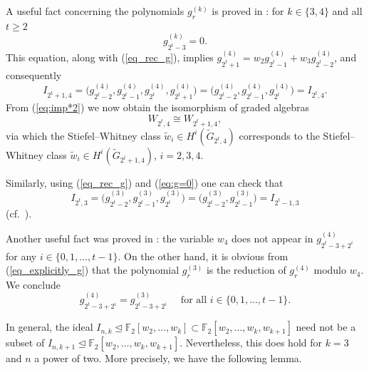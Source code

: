 \documentclass{amsart}
\theoremstyle{definition}
\theoremstyle{remark}
\numberwithin{equation}{section}
\newcommand{\gr}{\widetilde G}
\newcommand{\w}{\widetilde w}
\renewcommand{\ge}{\geqslant}
\begin{document}
A useful fact concerning the polynomials $g_r^{(k)}$ is proved in \cite[Lemma 2.3(ii)]{Korbas}: for $k\in\{3,4\}$ and all $t\ge2$
\begin{equation}\label{eq:g=0}
g_{2^t-3}^{(k)} = 0.
\end{equation}
This equation, along with (\ref{eq_rec_g}), implies 
$g_{2^t+1}^{(4)}=w_2 g_{2^t-1}^{(4)} + w_3 g_{2^t-2}^{(4)}$,
and consequently
\begin{equation}\label{I_2^t=I_2^t+1}
 I_{2^t+1,4}=\big(g_{2^t-2}^{(4)},g_{2^t-1}^{(4)},g_{2^t}^{(4)},g_{2^t+1}^{(4)}\big)=\big(g_{2^t-2}^{(4)},g_{2^t-1}^{(4)},g_{2^t}^{(4)}\big)=I_{2^t,4}.   
\end{equation}
From (\ref{eq:imp*2}) we now obtain the isomorphism of graded algebras
\begin{equation}\label{W_2^t=W_2^t+1}
 W_{2^t,4}\cong W_{2^t+1,4},   
\end{equation}
via which the Stiefel--Whitney class $\w_i\in H^i(\gr_{2^t,4})$ corresponds to the Stiefel--Whitney class $\w_i\in H^i(\gr_{2^t+1,4})$, $i=2,3,4$.

Similarly, using (\ref{eq_rec_g}) and (\ref{eq:g=0}) one can check that
\begin{equation}\label{I_2^t=I_2^t-1}
 I_{2^t,3}=\big(g_{2^t-2}^{(3)},g_{2^t-1}^{(3)},g_{2^t}^{(3)}\big)=\big(g_{2^t-2}^{(3)},g_{2^t-1}^{(3)}\big)=I_{2^t-1,3}  
\end{equation}
(cf.\ \cite[Remark 3.16]{CP-cl}).

Another useful fact was proved in \cite[Lemma 4.6]{CJP}: the variable $w_4$ does not appear in $g_{2^t-3+2^i}^{(4)}$ for any $i\in\{0,1,\ldots,t-1\}$. On the other hand, it is obvious from (\ref{eq_explicitly_g}) that the polynomial $g_r^{(3)}$ is the reduction of $g_r^{(4)}$ modulo $w_4$. We conclude
\begin{equation}\label{3=4}
g_{2^t-3+2^i}^{(4)}=g_{2^t-3+2^i}^{(3)} \quad \mbox{ for all } i\in\{0,1,\ldots,t-1\}.
    \end{equation}
 

In general, the ideal $I_{n,k}\trianglelefteq\mathbb F_2[w_2,\ldots,w_k]\subset\mathbb F_2[w_2,\ldots,w_k,w_{k+1}]$ need not be a subset of $I_{n,k+1}\trianglelefteq\mathbb F_2[w_2,\ldots,w_k,w_{k+1}]$. Nevertheless, this does hold for $k=3$ and $n$ a power of two. More precisely, we have the following lemma.
\end{document}
